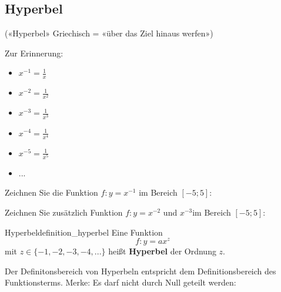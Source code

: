 \newpage

\subsection{Hyperbel}
(«Hyperbel» Griechisch = «über das Ziel hinaus werfen»)


Zur Erinnerung:
\begin{multicols}{2}
\begin{itemize}
	\item $x^{-1} = \frac{1}{x}$
	\item $x^{-2} = \frac{1}{x^2}$
	\item $x^{-3} = \frac{1}{x^3}$
	\item $x^{-4} = \frac{1}{x^4}$
	\item $x^{-5} = \frac{1}{x^5}$
  \item ...
\end{itemize}
\end{multicols}

Zeichnen Sie die Funktion $f: y = x^{-1}$ im Bereich $[-5;5]$:


\newpage


Zeichnen Sie zusätzlich Funktion $f: y = x^{-2}$  und $x^{-3}$im Bereich $[-5;5]$:


\begin{definition}{Hyperbel}{definition_hyperbel}
  Eine Funktion $$f: y=ax^z$$
  mit $z \in \{-1, -2, -3, -4, ...\}$ heißt
\textbf{Hyperbel} der Ordnung $z$.
\end{definition}

Der Definitonsbereich von Hyperbeln entspricht dem Definitionsbereich
des Funktionsterms. Merke: Es darf nicht durch Null geteilt werden:

